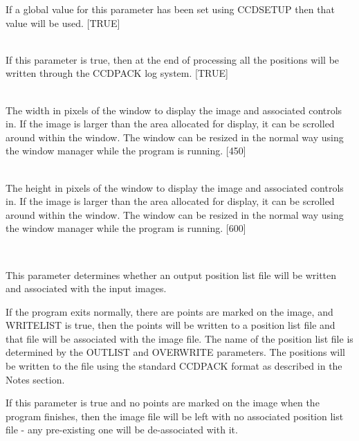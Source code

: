 \documentclass[twoside,11pt]{article}
\newcommand{\htmlref}[2]{#1}
\renewcommand{\_}{\texttt{\symbol{95}}}
\newcommand{\xroutine}[1]{\htmlref{{\sc #1}}{#1}}
\newcommand{\sstsubsection}[1]{ \item[{#1}] \mbox{} \\}
\newcommand{\sstsubsection}[1]{\item[{#1}]}
\begin{document}
{{{         If a global value for this parameter has been set using
         \xroutine{CCDSETUP} then that value will be used.
         [TRUE]
      }
      \sstsubsection{
         VERBOSE = \_LOGICAL (Read)
      }{
         If this parameter is true, then at the end of processing all
         the positions will be written through the CCDPACK log system.
         [TRUE]
      }
      \sstsubsection{
         WINX = \_INTEGER (Read and Write)
      }{
         The width in pixels of the window to display the image and
         associated controls in.  If the image is larger than the area
         allocated for display, it can be scrolled around within the
         window.  The window can be resized in the normal way using
         the window manager while the program is running.
         [450]
      }
      \sstsubsection{
         WINY = \_INTEGER (Read and Write)
      }{
         The height in pixels of the window to display the image and
         associated controls in.  If the image is larger than the area
         allocated for display, it can be scrolled around within the
         window.  The window can be resized in the normal way using
         the window manager while the program is running.
         [600]
      }
      \sstsubsection{
         WRITELIST = \_LOGICAL (Read)
      }{
         This parameter determines whether an output position list
         file will be written and associated with the input images.

         If the program exits normally, there are points are marked
         on the image, and WRITELIST is true, then the points will be
         written to a position list file and that file will be associated
         with the image file.  The name of the position list file is
         determined by the OUTLIST and OVERWRITE parameters.  The
         positions will be written to the file using the standard
         CCDPACK format as described in the Notes section.

         If this parameter is true and no points are marked on the
         image when the program finishes, then the image file will be
         left with no associated position list file - any pre-existing
         one will be de-associated with it.

}}}
\end{document}
